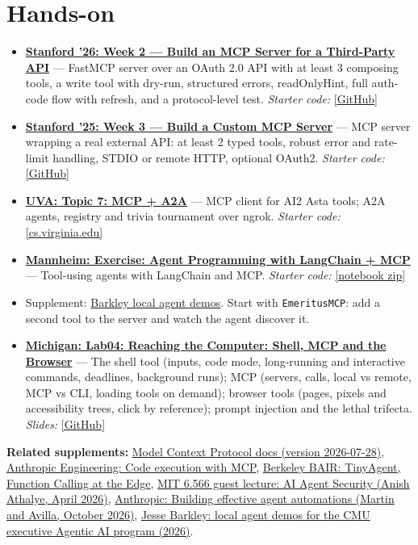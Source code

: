 \documentclass[10pt,oneside]{report}
\begin{document}
\section{Hands-on}
\begin{itemize}
\item \hyperlink{asg-STAN26-2}{\textbf{Stanford '26: Week 2 --- Build an MCP Server for a Third-Party API}} --- FastMCP server over an OAuth 2.0 API with at least 3 composing tools, a write tool with dry-run, structured errors, readOnlyHint, full auth-code flow with refresh, and a protocol-level test. \textit{Starter code:} \href{https://github.com/mihail911/modern-software-dev-assignments/blob/master/week2/assignment.md}{[GitHub]}
\item \hyperlink{asg-STAN25-3}{\textbf{Stanford '25: Week 3 --- Build a Custom MCP Server}} --- MCP server wrapping a real external API: at least 2 typed tools, robust error and rate-limit handling, STDIO or remote HTTP, optional OAuth2. \textit{Starter code:} \href{https://github.com/mihail911/modern-software-dev-assignments/tree/fall2025/week3}{[GitHub]}
\item \hyperlink{asg-UVA-7}{\textbf{UVA: Topic 7: MCP + A2A}} --- MCP client for AI2 Asta tools; A2A agents, registry and trivia tournament over ngrok. \textit{Starter code:} \href{https://www.cs.virginia.edu/\%7Ermw7my/Courses/AgenticAISpring2026/Topic7MCP/mcp.html}{[cs.virginia.edu]}
\item \hyperlink{asg-MANN-3}{\textbf{Mannheim: Exercise: Agent Programming with LangChain + MCP}} --- Tool-using agents with LangChain and MCP. \textit{Starter code:} \href{https://www.uni-mannheim.de/media/Einrichtungen/dws/Files_Teaching/Large_Language_Models_and_Agents/FSS2026/IE685_LA_EX_Agent_Programming_LangChain_MCP.ipynb.zip}{[notebook zip]}
\item Supplement: \hyperref[sup-barkley]{Barkley local agent demos}. Start with \texttt{EmeritusMCP}: add a second tool to the server and watch the agent discover it.
\item \hyperlink{asg-UMICH-11}{\textbf{Michigan: Lab04: Reaching the Computer: Shell, MCP and the Browser}} --- The shell tool (inputs, code mode, long-running and interactive commands, deadlines, background runs); MCP (servers, calls, local vs remote, MCP vs CLI, loading tools on demand); browser tools (pages, pixels and accessibility trees, click by reference); prompt injection and the lethal trifecta. \textit{Slides:} \href{https://github.com/eecs498-aase/materials/blob/main/labs/Lab04/slides.pdf}{[GitHub]}
\end{itemize}
\textbf{Related supplements:} \hyperref[sup-mcp]{Model Context Protocol docs (version 2026-07-28)}, \hyperref[sup-codeexec]{Anthropic Engineering: Code execution with MCP}, \hyperref[sup-tinyagent]{Berkeley BAIR: TinyAgent, Function Calling at the Edge}, \hyperref[sup-agentsec]{MIT 6.566 guest lecture: AI Agent Security (Anish Athalye, April 2026)}, \hyperref[sup-anthauto]{Anthropic: Building effective agent automations (Martin and Avilla, October 2026)}, \hyperref[sup-barkley]{Jesse Barkley: local agent demos for the CMU executive Agentic AI program (2026)}.
\end{document}
